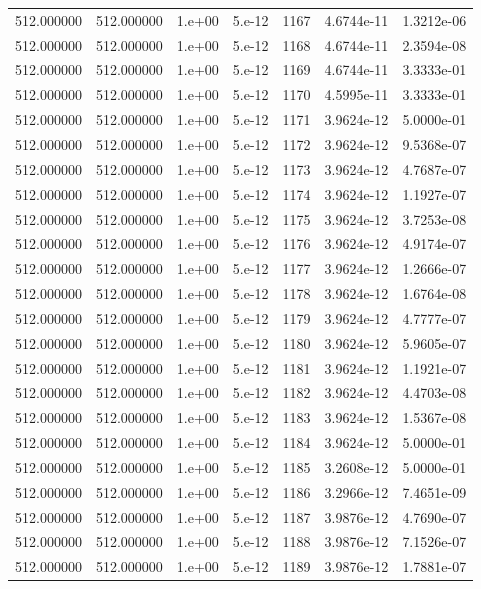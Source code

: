 \begin{table}[htbp]
\begin{tabular}{rrrrrrr}
512.000000 & 512.000000 & 1.e+00 & 5.e-12 & 1167 & 4.6744e-11 & 1.3212e-06 \\
512.000000 & 512.000000 & 1.e+00 & 5.e-12 & 1168 & 4.6744e-11 & 2.3594e-08 \\
512.000000 & 512.000000 & 1.e+00 & 5.e-12 & 1169 & 4.6744e-11 & 3.3333e-01 \\
512.000000 & 512.000000 & 1.e+00 & 5.e-12 & 1170 & 4.5995e-11 & 3.3333e-01 \\
512.000000 & 512.000000 & 1.e+00 & 5.e-12 & 1171 & 3.9624e-12 & 5.0000e-01 \\
512.000000 & 512.000000 & 1.e+00 & 5.e-12 & 1172 & 3.9624e-12 & 9.5368e-07 \\
512.000000 & 512.000000 & 1.e+00 & 5.e-12 & 1173 & 3.9624e-12 & 4.7687e-07 \\
512.000000 & 512.000000 & 1.e+00 & 5.e-12 & 1174 & 3.9624e-12 & 1.1927e-07 \\
512.000000 & 512.000000 & 1.e+00 & 5.e-12 & 1175 & 3.9624e-12 & 3.7253e-08 \\
512.000000 & 512.000000 & 1.e+00 & 5.e-12 & 1176 & 3.9624e-12 & 4.9174e-07 \\
512.000000 & 512.000000 & 1.e+00 & 5.e-12 & 1177 & 3.9624e-12 & 1.2666e-07 \\
512.000000 & 512.000000 & 1.e+00 & 5.e-12 & 1178 & 3.9624e-12 & 1.6764e-08 \\
512.000000 & 512.000000 & 1.e+00 & 5.e-12 & 1179 & 3.9624e-12 & 4.7777e-07 \\
512.000000 & 512.000000 & 1.e+00 & 5.e-12 & 1180 & 3.9624e-12 & 5.9605e-07 \\
512.000000 & 512.000000 & 1.e+00 & 5.e-12 & 1181 & 3.9624e-12 & 1.1921e-07 \\
512.000000 & 512.000000 & 1.e+00 & 5.e-12 & 1182 & 3.9624e-12 & 4.4703e-08 \\
512.000000 & 512.000000 & 1.e+00 & 5.e-12 & 1183 & 3.9624e-12 & 1.5367e-08 \\
512.000000 & 512.000000 & 1.e+00 & 5.e-12 & 1184 & 3.9624e-12 & 5.0000e-01 \\
512.000000 & 512.000000 & 1.e+00 & 5.e-12 & 1185 & 3.2608e-12 & 5.0000e-01 \\
512.000000 & 512.000000 & 1.e+00 & 5.e-12 & 1186 & 3.2966e-12 & 7.4651e-09 \\
512.000000 & 512.000000 & 1.e+00 & 5.e-12 & 1187 & 3.9876e-12 & 4.7690e-07 \\
512.000000 & 512.000000 & 1.e+00 & 5.e-12 & 1188 & 3.9876e-12 & 7.1526e-07 \\
512.000000 & 512.000000 & 1.e+00 & 5.e-12 & 1189 & 3.9876e-12 & 1.7881e-07 \\

\end{tabular}
\end{table}
